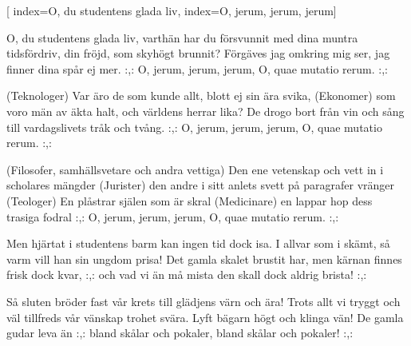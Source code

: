 [
	index={O, du studentens glada liv},
	index={O, jerum, jerum, jerum}]

\beginverse* 
O, du studentens glada liv,
varthän har du försvunnit
med dina muntra tidsfördriv,
din fröjd, som skyhögt brunnit?
Förgäves jag omkring mig ser,
jag finner dina spår ej mer.
:,: O, jerum, jerum, jerum,
O, quae mutatio rerum. :,:
\endverse

\beginverse* 
(Teknologer) Var äro de som kunde allt,
blott ej sin ära svika,
(Ekonomer) som voro män av äkta halt,
och världens herrar lika?
De drogo bort från vin och sång
till vardagslivets tråk och tvång.
:,: O, jerum, jerum, jerum,
O, quae mutatio rerum. :,:
\endverse

\beginverse* 
(Filosofer, samhällsvetare och andra vettiga) Den ene vetenskap och vett
in i scholares mängder
(Jurister) den andre i sitt anlets svett
på paragrafer vränger
(Teologer) En plåstrar själen som är skral
(Medicinare) en lappar hop dess trasiga fodral 
:,: O, jerum, jerum, jerum,
O, quae mutatio rerum. :,:
\endverse


\beginverse* 
Men hjärtat i studentens barm
kan ingen tid dock isa.
I allvar som i skämt, så varm
vill han sin ungdom prisa!
Det gamla skalet brustit har,
men kärnan finnes frisk dock kvar,
:,: och vad vi än må mista
den skall dock aldrig brista! :,:
\endverse

\beginverse* 
Så sluten bröder fast vår krets
till glädjens värn och ära!
Trots allt vi tryggt och väl tillfreds
vår vänskap trohet svära.
Lyft bägarn högt och klinga vän!
De gamla gudar leva än 
:,: bland skålar och pokaler,
bland skålar och pokaler! :,: 
\endverse
\endsong


